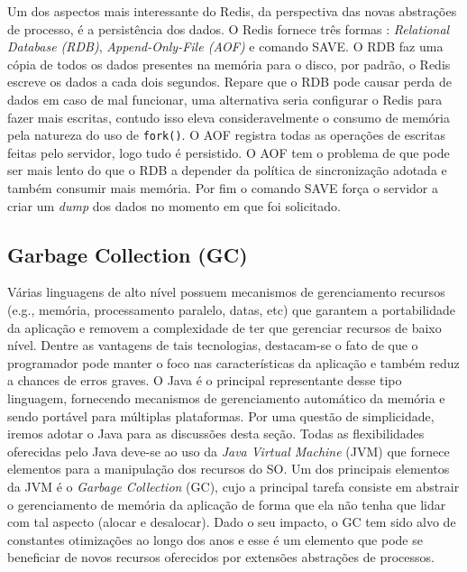 Um dos aspectos mais interessante do Redis, da perspectiva das novas abstrações
de processo, é a persistência dos dados. O Redis fornece três formas
\citep{redisio}: \textit{Relational Database (RDB)}, \textit{Append-Only-File
(AOF)} e comando SAVE. O RDB faz uma cópia de todos os dados presentes na
memória para o disco, por padrão, o Redis escreve os dados a cada dois
segundos. Repare que o RDB pode causar perda de dados em caso de mal funcionar,
uma alternativa seria configurar o Redis para fazer mais escritas, contudo isso
eleva consideravelmente o consumo de memória pela natureza do uso de
\texttt{fork()}. O AOF registra todas as operações de escritas feitas pelo
servidor, logo tudo é persistido. O AOF tem o problema de que pode ser mais
lento do que o RDB a depender da política de sincronização adotada e também
consumir mais memória.  Por fim o comando SAVE força o servidor a criar um
\textit{dump} dos dados no momento em que foi solicitado.


\subsection{Garbage Collection (GC)}

Várias linguagens de alto nível possuem mecanismos de gerenciamento recursos
(e.g., memória, processamento paralelo, datas, etc) que garantem a portabilidade
da aplicação e removem a complexidade de ter que gerenciar recursos de baixo
nível. Dentre as vantagens de tais tecnologias, destacam-se o fato de que o
programador pode manter o foco nas características da aplicação e também reduz
a chances de erros graves. O Java é o principal representante desse tipo
linguagem, fornecendo mecanismos de gerenciamento automático da memória e sendo
portável para múltiplas plataformas. Por uma questão de simplicidade, iremos
adotar o Java para as discussões desta seção. Todas as flexibilidades
oferecidas pelo Java deve-se ao uso da \textit{Java Virtual Machine} (JVM) que
fornece elementos para a manipulação dos recursos do SO. Um dos principais
elementos da JVM é o \textit{Garbage Collection} (GC), cujo a principal tarefa
consiste em abstrair o gerenciamento de memória da aplicação de forma que ela
não tenha que lidar com tal aspecto (alocar e desalocar). Dado o seu impacto, o
GC tem sido alvo de constantes otimizações ao longo dos anos e esse é um
elemento que pode se beneficiar de novos recursos oferecidos por extensões
abstrações de processos.

